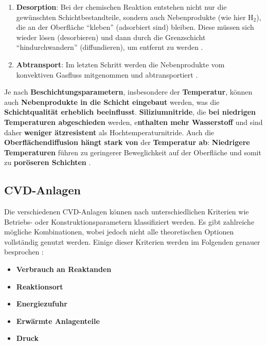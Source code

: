 \documentclass{article} %
\begin{document}
\begin{enumerate}
{    gemeint, dass das Reaktionsprodukt in die Oberfläche diffundiert. Es wandert also in die Schicht hinein und verteilt sich.} und möglichst bis an die 
    Schichtkante transportiert \cite{keplinger2024CVD}.
    \item \textbf{Desorption}: Bei der chemischen Reaktion entstehen nicht nur die gewünschten Schichtbestandteile, sondern auch Nebenprodukte (wie hier H$_2$), 
    die an der Oberfläche ``kleben'' (adsorbiert sind) bleiben. Diese müssen sich wieder lösen (desorbieren) und dann durch die Grenzschicht ``hindurchwandern'' 
    (diffundieren), um entfernt zu werden \cite{keplinger2024CVD}.
    \item \textbf{Abtransport}: Im letzten Schritt werden die Nebenprodukte vom konvektiven Gasfluss mitgenommen und abtransportiert \cite{keplinger2024CVD}.
\end{enumerate}

Je nach \textbf{Beschichtungsparametern}, insbesondere der \textbf{Temperatur}, können auch \textbf{Nebenprodukte in die Schicht eingebaut} werden, was die 
\textbf{Schichtqualität erheblich beeinflusst}. \textbf{Siliziumnitride}, die \textbf{bei niedrigen Temperaturen abgeschieden} werden, e\textbf{nthalten mehr 
Wasserstoff} und sind daher \textbf{weniger ätzresistent} als Hochtemperaturnitride. Auch die \textbf{Oberflächendiffusion hängt stark von} der \textbf{Temperatur 
ab}: \textbf{Niedrigere Temperaturen} führen zu geringerer Beweglichkeit auf der Oberfläche und somit zu \textbf{poröseren Schichten} \cite{keplinger2024CVD}.

\vspace{1em}
\subsection{CVD-Anlagen} %
Die verschiedenen CVD-Anlagen können nach unterschiedlichen Kriterien wie Betriebs- oder Konstruktionsparametern klassifiziert werden. Es gibt zahlreiche mögliche 
Kombinationen, wobei jedoch nicht alle theoretischen Optionen vollständig genutzt werden. Einige dieser Kriterien werden im Folgenden genauer besprochen 
\cite{keplinger2024CVD}:

\begin{itemize}
    \item \textbf{Verbrauch an Reaktanden}
    \item \textbf{Reaktionsort}
    \item \textbf{Energiezufuhr}
    \item \textbf{Erwärmte Anlagenteile}
    \item \textbf{Druck}
\end{itemize}
\end{document}
